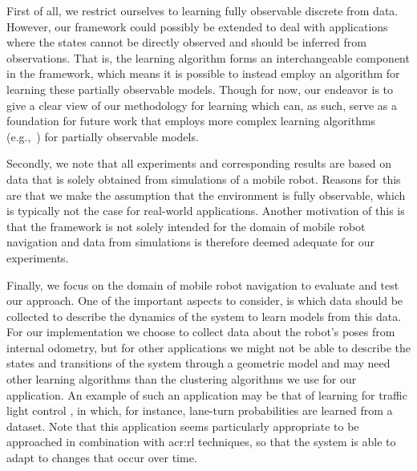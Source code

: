 First of all, we restrict ourselves to learning fully observable discrete  from data.
However, our framework could possibly be extended to deal with applications where the states cannot be directly observed and should be inferred from observations.
That is, the learning algorithm forms an interchangeable component in the framework, which means it is possible to instead employ an algorithm for learning these partially observable models.
Though for now, our endeavor is to give a clear view of our methodology for learning  which can, as such, serve as a foundation for future work that employs more complex learning algorithms (e.g.,~\cite{koenig1996unsupervised, nikovski2000learning, nikovski2002state, shatkay1997learning}) for partially observable models.

Secondly, we note that all experiments and corresponding results are based on data that is solely obtained from simulations of a mobile robot.
Reasons for this are that we make the assumption that the environment is fully observable, which is typically not the case for real-world applications.
Another motivation of this is that the framework is not solely intended for the domain of mobile robot navigation and data from simulations is therefore deemed adequate for our experiments. %

Finally, we focus on the domain of mobile robot navigation to evaluate and test our approach.
One of the important aspects to consider, is which data should be collected to describe the dynamics of the system to learn models from this data.
For our implementation we choose to collect data about the robot's poses from internal odometry, but for other applications we might not be able to describe the states and transitions of the system through a geometric model and may need other learning algorithms than the clustering algorithms we use for our application.
An example of such an application may be that of learning  for traffic light control \cite{wiering2004intelligent, delgado2011efficient}, in which, for instance, lane-turn probabilities are learned from a dataset.
Note that this application seems particularly appropriate to be approached in combination with \acrshort{acr:rl} techniques, so that the system is able to adapt to changes that occur over time.


